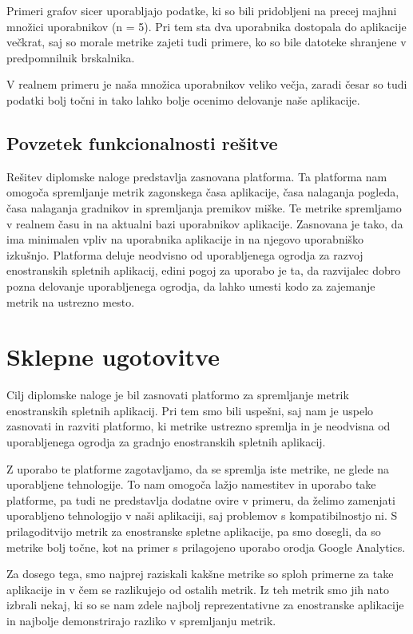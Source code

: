 \documentclass[a4paper, 12pt]{book}
\begin{document}
Primeri grafov sicer uporabljajo podatke, ki so bili pridobljeni na precej majhni množici uporabnikov (n = 5). Pri tem sta dva uporabnika dostopala do aplikacije večkrat, saj so morale metrike zajeti tudi primere, ko so bile datoteke shranjene v predpomnilnik brskalnika.

V realnem primeru je naša množica uporabnikov veliko večja, zaradi česar so tudi podatki bolj točni in tako lahko bolje ocenimo delovanje naše aplikacije.

\section{Povzetek funkcionalnosti rešitve}

Rešitev diplomske naloge predstavlja zasnovana platforma. Ta platforma nam omogoča spremljanje metrik zagonskega časa aplikacije, časa nalaganja pogleda, časa nalaganja gradnikov in spremljanja premikov miške. Te metrike spremljamo v realnem času in na aktualni bazi uporabnikov aplikacije. Zasnovana je tako, da ima minimalen vpliv na uporabnika aplikacije in na njegovo uporabniško izkušnjo. Platforma deluje neodvisno od uporabljenega ogrodja za razvoj enostranskih spletnih aplikacij, edini pogoj za uporabo je ta, da razvijalec dobro pozna delovanje uporabljenega ogrodja, da lahko umesti kodo za zajemanje metrik na ustrezno mesto.

\chapter{Sklepne ugotovitve}
\label{ch4}

Cilj diplomske naloge je bil zasnovati platformo za spremljanje metrik enostranskih spletnih aplikacij. Pri tem smo bili uspešni, saj nam je uspelo zasnovati in razviti platformo, ki metrike ustrezno spremlja in je neodvisna od uporabljenega ogrodja za gradnjo enostranskih spletnih aplikacij.

Z uporabo te platforme zagotavljamo, da se spremlja iste metrike, ne glede na uporabljene tehnologije. To nam omogoča lažjo namestitev in uporabo take platforme, pa tudi ne predstavlja dodatne ovire v primeru, da želimo zamenjati uporabljeno tehnologijo v naši aplikaciji, saj problemov s kompatibilnostjo ni. S prilagoditvijo metrik za enostranske spletne aplikacije, pa smo dosegli, da so metrike bolj točne, kot na primer s prilagojeno uporabo orodja Google Analytics.

Za dosego tega, smo najprej raziskali kakšne metrike so sploh primerne za take aplikacije in v čem se razlikujejo od ostalih metrik. Iz teh metrik smo jih nato izbrali nekaj, ki so se nam zdele najbolj reprezentativne za enostranske aplikacije in najbolje demonstrirajo razliko v spremljanju metrik.
\end{document}
